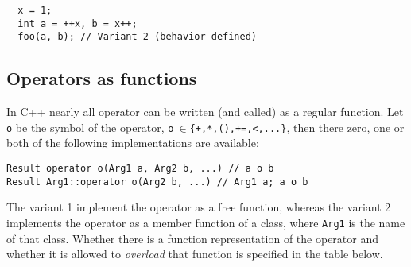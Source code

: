 {\begin{example}
\begin{verbatim}
  x = 1;
  int a = ++x, b = x++;
  foo(a, b); // Variant 2 (behavior defined)
  \end{verbatim}
\end{example}


\subsection{Operators as functions}
In C++ nearly all operator can be written (and called) as a regular function. Let \texttt{o} be the symbol of the operator, \eg \texttt{o$~\in$\{+,*,(),+=,<,...\}}, then there zero, one or both of the following implementations are available:

\begin{verbatim}
Result operator o(Arg1 a, Arg2 b, ...) // a o b
Result Arg1::operator o(Arg2 b, ...) // Arg1 a; a o b
\end{verbatim}
The variant 1 implement the operator as a free function, whereas the variant 2 implements the operator as a member function of a class, where \texttt{Arg1} is the name of that class. Whether there is a function representation of the operator and whether it is allowed to \emph{overload} that function is specified in the table below.

}
